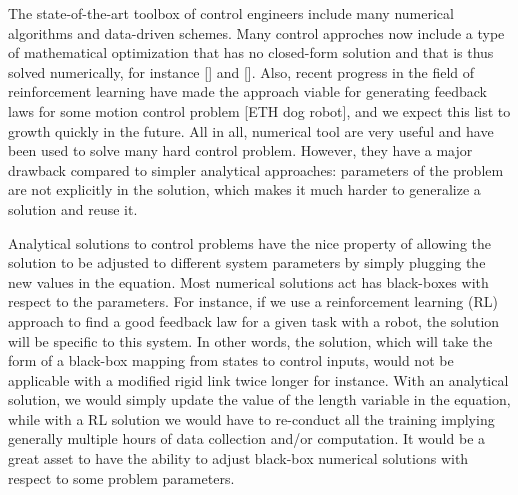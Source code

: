

The state-of-the-art toolbox of control engineers include many numerical algorithms and data-driven schemes. Many control approches now include a type of mathematical optimization that has no closed-form solution and that is thus solved numerically, for instance [] and []. Also, recent progress in the field of reinforcement learning have made the approach viable for generating feedback laws for some motion control problem [ETH dog robot], and we expect this list to growth quickly in the future. All in all, numerical tool are very useful and have been used to solve many hard control problem. However, they have a major drawback compared to simpler analytical approaches: parameters of the problem are not explicitly in the solution, which makes it much harder to generalize a solution and reuse it.

Analytical solutions to control problems have the nice property of allowing the solution to be adjusted to different system parameters by simply plugging the new values in the equation. Most numerical solutions act has black-boxes with respect to the parameters. For instance, if we use a reinforcement learning (RL) approach to find a good feedback law for a given task with a robot, the solution will be specific to this system. In other words, the solution, which will take the form of a black-box mapping from states to control inputs, would not be applicable with a modified rigid link twice longer for instance. With an analytical solution, we would simply update the value of the length variable in the equation, while with a RL solution we would have to re-conduct all the training implying generally multiple hours of data collection and/or computation. It would be a great asset to have the ability to adjust black-box numerical solutions with respect to some problem parameters.  

